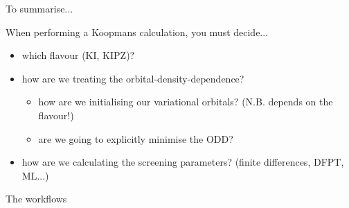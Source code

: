 \documentclass[xcolor=table,aspectratio=169]{beamer}
\numberwithin{equation}{section}
\begin{document}
\begin{frame}{To summarise...}

   When performing a Koopmans calculation, you must decide...
   \begin{itemize}[<+(1)->]
      \item which flavour (KI, KIPZ)?
      \item how are we treating the orbital-density-dependence?
      \begin{itemize}
         \item how are we initialising our variational orbitals? (N.B. depends on the flavour!)
         \item are we going to explicitly minimise the ODD?
      \end{itemize}
      \item how are we calculating the screening parameters? (finite differences, DFPT, ML...)
   \end{itemize}
   
\end{frame}

\begin{frame}{The workflows}

   \vspace{1ex}


   \vspace{-1.5ex}



\end{frame}
\end{document}

